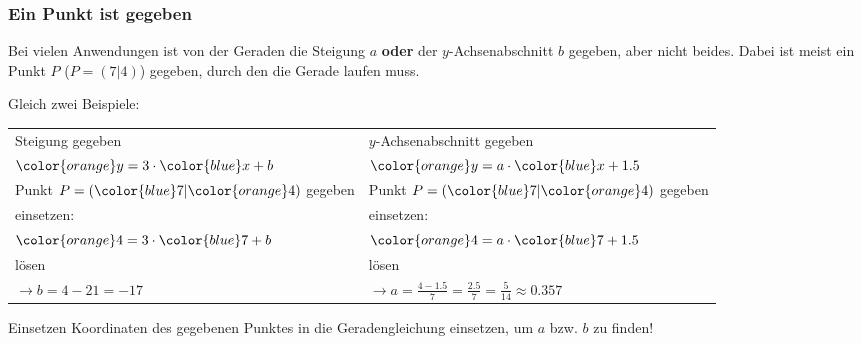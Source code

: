
\subsubsection{Ein Punkt ist gegeben}
Bei vielen Anwendungen ist von der Geraden die Steigung $a$
\textbf{oder} der $y$-Achsenabschnitt $b$ gegeben, aber nicht
beides. Dabei ist meist ein Punkt $P$ (\zB $P=(7|4)$) gegeben, durch
den die Gerade laufen muss.

Gleich zwei Beispiele:

\begin{tabular}{p{8cm}|p{8cm}}
  Steigung gegeben & $y$-Achsenabschnitt gegeben \\
  ${\color{orange}y}=3\cdot{}{\color{blue}x}+b$ & ${\color{orange}y}=a\cdot{}{\color{blue}x}+1.5$\\
  \hline
  Punkt $P=({\color{blue}7}|{\color{orange}4})$ gegeben & Punkt $P=({\color{blue}7}|{\color{orange}4})$ gegeben\\
  \hline
  einsetzen: & einsetzen: \\
  ${\color{orange}4} = 3\cdot{}{\color{blue}7} + b$ & ${\color{orange}4}=a\cdot{}{\color{blue}7} + 1.5$\\
  \hline
  lösen & lösen\\
  $\longrightarrow b=4-21=-17$ & $\longrightarrow a=\frac{4-1.5}{7} =\frac{2.5}{7}=\frac{5}{14} \approx{} 0.357$

  \end{tabular}


\begin{rezept}{Einsetzen}{}
Koordinaten des gegebenen Punktes in die
  Geradengleichung einsetzen, um $a$ bzw. $b$ zu finden!
\end{rezept}

